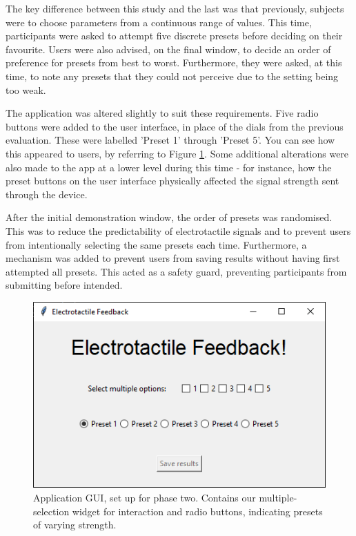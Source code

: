 \documentclass{mpaper}
\begin{document}
The key difference between this study and the last was that previously, subjects were to choose parameters from a continuous range of values. This time, participants were asked to attempt five discrete presets before deciding on their favourite. Users were also advised, on the final window, to decide an order of preference for presets from best to worst. Furthermore, they were asked, at this time, to note any presets that they could not perceive due to the setting being too weak. 

The application was altered slightly to suit these requirements. Five radio buttons were added to the user interface, in place of the dials from the previous evaluation. These were labelled 'Preset 1' through 'Preset 5'. You can see how this appeared to users, by referring to Figure \ref{fig:tactile-application2}. Some additional alterations were also made to the app at a lower level during this time - for instance, how the preset buttons on the user interface physically affected the signal strength sent through the device. 

After the initial demonstration window, the order of presets was randomised. This was to reduce the predictability of electrotactile signals and to prevent users from intentionally selecting the same presets each time. Furthermore, a mechanism was added to prevent users from saving results without having first attempted all presets. This acted as a safety guard, preventing participants from submitting before intended. 

\begin{figure}
    \centering
    \includegraphics[scale=0.5]{images/Screenshot 2024-02-24 151633.png}
    \caption{Application GUI, set up for phase two. Contains our multiple-selection widget for interaction and radio buttons, indicating presets of varying strength.}
    \label{fig:tactile-application2}
\end{figure}
\end{document}
